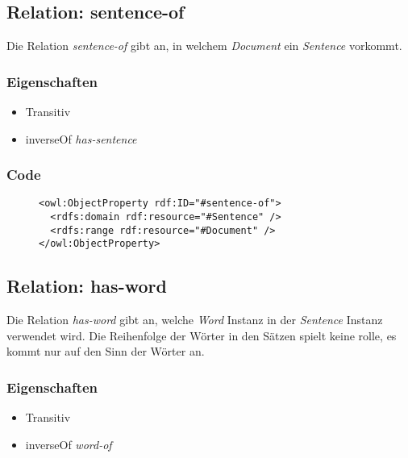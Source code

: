 \documentclass[
    11pt,
    latin1,
    a4paper,
    oneside
]{scrreprt}
\begin{document}
\subsection{Relation: sentence-of} \label{sec:rel_sentenceof}

Die Relation \emph{sentence-of} gibt an, in welchem \emph{Document} ein \emph{Sentence} vorkommt.

\subsubsection{Eigenschaften} \label{sec:rel_sentenceof_settings}

\begin{itemize}
  \item Transitiv
  \item inverseOf \emph{has-sentence}
\end{itemize}

\subsubsection{Code} \label{sec:rel_sentenceof_code}

\begin{figure}[h]
 \lstset{language=XML}
 \begin{lstlisting}[label=owl:sentenceof,caption={Die Relation \emph{sentenceof} gibt an, in welchem Dokument ein Satz vorkommt}]
<owl:ObjectProperty rdf:ID="#sentence-of">
  <rdfs:domain rdf:resource="#Sentence" />
  <rdfs:range rdf:resource="#Document" />
</owl:ObjectProperty>
 \end{lstlisting}
\end{figure}


\subsection{Relation: has-word} \label{sec:rel_hasword}

Die Relation \emph{has-word} gibt an, welche \emph{Word} Instanz in der \emph{Sentence} Instanz verwendet wird. Die Reihenfolge der W\"orter in den S\"atzen spielt keine rolle, es kommt nur auf den Sinn der W\"orter an.

\subsubsection{Eigenschaften} \label{sec:rel_hasword_settings}

\begin{itemize}
  \item Transitiv
  \item inverseOf \emph{word-of}
\end{itemize}
\end{document}
